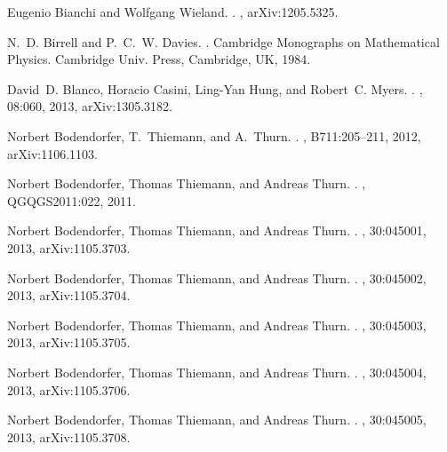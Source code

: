 \documentclass[aps, nofootinbib,superscriptaddress,12pt]{revtex4-2}
\begin{document}
\begin{thebibliography}{100}
Eugenio Bianchi and Wolfgang Wieland.
.
, arXiv:1205.5325.

N.~D. Birrell and P.~C.~W. Davies.
.
\newblock Cambridge Monographs on Mathematical Physics. Cambridge Univ. Press,
  Cambridge, UK, 1984.

David~D. Blanco, Horacio Casini, Ling-Yan Hung, and Robert~C. Myers.
.
, 08:060, 2013, arXiv:1305.3182.

Norbert Bodendorfer, T.~Thiemann, and A.~Thurn.
.
, B711:205--211, 2012, arXiv:1106.1103.

Norbert Bodendorfer, Thomas Thiemann, and Andreas Thurn.
.
, QGQGS2011:022, 2011.

Norbert Bodendorfer, Thomas Thiemann, and Andreas Thurn.
.
, 30:045001, 2013, arXiv:1105.3703.

Norbert Bodendorfer, Thomas Thiemann, and Andreas Thurn.
.
, 30:045002, 2013, arXiv:1105.3704.

Norbert Bodendorfer, Thomas Thiemann, and Andreas Thurn.
.
, 30:045003, 2013, arXiv:1105.3705.

Norbert Bodendorfer, Thomas Thiemann, and Andreas Thurn.
.
, 30:045004, 2013, arXiv:1105.3706.

Norbert Bodendorfer, Thomas Thiemann, and Andreas Thurn.
.
, 30:045005, 2013, arXiv:1105.3708.


\end{thebibliography}
\end{document}
